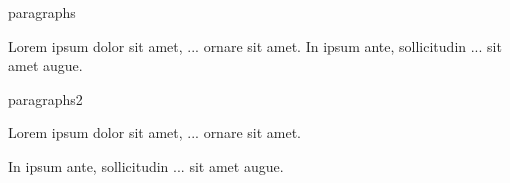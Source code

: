     

\begin{saveblock}{paragraphs}
    \begin{highlightblock}[linewidth=0.5\textwidth,gobble=8]
        Lorem ipsum dolor sit amet,
        ... ornare sit amet.
        In ipsum ante, sollicitudin
        ... sit amet augue.
    \end{highlightblock}
\end{saveblock}

\begin{saveblock}{paragraphs2}
    \begin{highlightblock}[linewidth=0.5\textwidth,gobble=8]
        Lorem ipsum dolor sit amet,
        ... ornare sit amet.
        
        In ipsum ante, sollicitudin
        ... sit amet augue.
    \end{highlightblock}
\end{saveblock}


